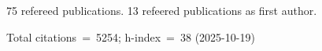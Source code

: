 75 refereed publications. 13 refeered publications as first author.

Total citations~=~5254; h-index~=~38 (2025-10-19)